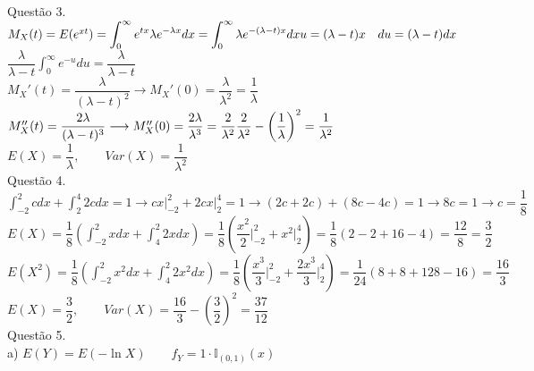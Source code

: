 \documentclass[12pt]{article}
\begin{document}
\noindent Questão 3.\\

$M_{X}(t)=E(e^{xt})=\displaystyle\int_{0}^{\infty}e^{tx}\lambda e^{-\lambda x}dx=\displaystyle\int_{0}^{\infty}\lambda e^{-(\lambda-t)x}dx\hfill u=(\lambda-t)x\quad du=(\lambda-t)dx$\\

$\dfrac{\lambda}{\lambda-t}\displaystyle\int_{0}^{\infty}e^{-u}du=\dfrac{\lambda}{\lambda-t}$\\

$M_{X}'(t)=\dfrac{\lambda}{(\lambda-t)^{2}}\longrightarrow M_{X}'(0)=\dfrac{\lambda}{\lambda^{2}}=\dfrac{1}{\lambda}$\\

$M_{X}''(t)=\dfrac{2\lambda}{(\lambda-t)^{3}}\longrightarrow M_{X}''(0)=\dfrac{2\lambda}{\lambda^{3}}=\dfrac{2}{\lambda^{2}}\hfill\dfrac{2}{\lambda^{2}}-\left(\dfrac{1}{\lambda}\right)^{2}=\dfrac{1}{\lambda^{2}}$\\

$E(X)=\dfrac{1}{\lambda},\qquad Var(X)=\dfrac{1}{\lambda^{2}}$\\

\noindent Questão 4.\\

$\displaystyle\int_{-2}^{2}cdx+\int_{2}^{4}2cdx=1\longrightarrow cx\biggr|^{2}_{-2}+2cx\biggr|^{4}_{2}=1\longrightarrow(2c+2c)+(8c-4c)=1\longrightarrow8c=1\longrightarrow c=\dfrac{1}{8}$\\

$E(X)=\dfrac{1}{8}\left(\displaystyle\int_{-2}^{2}xdx+\int_{4}^{2}2xdx\right)=\dfrac{1}{8}\left(\dfrac{x^{2}}{2}\biggr|^{2}_{-2}+x^{2}\biggr|^{4}_{2}\right)=\dfrac{1}{8}\left(2-2+16-4\right)=\dfrac{12}{8}=\dfrac{3}{2}$\\

$E(X^{2})=\dfrac{1}{8}\left(\displaystyle\int_{-2}^{2}x^{2}dx+\int_{4}^{2}2x^{2}dx\right)=\dfrac{1}{8}\left(\dfrac{x^{3}}{3}\biggr|^{2}_{-2}+\dfrac{2x^{3}}{3}\biggr|^{4}_{2}\right)=\dfrac{1}{24}\left(8+8+128-16\right)=\dfrac{16}{3}$\\

$E(X)=\dfrac{3}{2},\qquad Var(X)=\dfrac{16}{3}-\left(\dfrac{3}{2}\right)^{2}=\dfrac{37}{12}$\\

\noindent Questão 5.\\

\noindent a) $E(Y)=E(-\ln X)\qquad f_{Y}=1\cdot\mathds{I}_{(0,1)}(x)$\\
\end{document}
